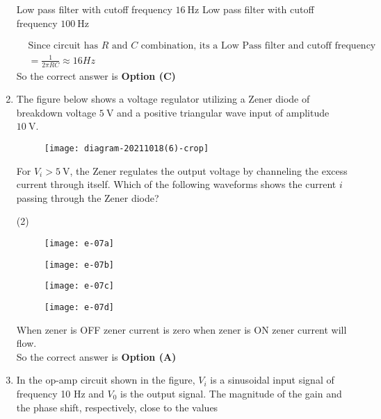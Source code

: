 \begin{enumerate}
\begin{tasks}
\task[\textbf{C.}] Low pass filter with cutoff frequency $16 \mathrm{~Hz}$
\task[\textbf{D.}] Low pass filter with cutoff frequency $100 \mathrm{~Hz}$
\end{tasks}
\begin{answer}
\begin{align*}
&\text{Since circuit has $R$ and $C$ combination, its a Low Pass filter and cutoff frequency}\\
&=\frac{1}{2 \pi R C} \approx 16 H z
\end{align*}
So the correct answer is \textbf{Option (C)}
\end{answer}
	\item The figure below shows a voltage regulator utilizing a Zener diode of breakdown voltage $5 \mathrm{~V}$ and a positive triangular wave input of amplitude $10 \mathrm{~V}$.\\
	\begin{figure}[H]
		\centering
		\texttt{[image: diagram-20211018(6)-crop]}
	\end{figure}
	For $V_{i}>5 \mathrm{~V}$, the Zener regulates the output voltage by channeling the excess current through itself. Which of the following waveforms shows the current $i$ passing through the Zener diode?
\begin{tasks}(2)
\task[\textbf{A.}] \begin{figure}[H]
	\centering
	\texttt{[image: e-07a]}
\end{figure}
\task[\textbf{B.}] \begin{figure}[H]
	\centering
	\texttt{[image: e-07b]}
\end{figure}
\task[\textbf{C.}] \begin{figure}[H]
	\centering
	\texttt{[image: e-07c]}
\end{figure}
\task[\textbf{D.}] \begin{figure}[H]
	\centering
	\texttt{[image: e-07d]}
\end{figure}
\end{tasks}
\begin{answer}$\left. \right. $\\
When zener is OFF zener current is zero when zener is $\mathrm{ON}$ zener current will flow.\\
So the correct answer is \textbf{Option (A)}
\end{answer}
	\item In the op-amp circuit shown in the figure, $V_{i}$ is a sinusoidal input signal of frequency 10 $\mathrm{Hz}$ and $V_{0}$ is the output signal. The magnitude of the gain and the phase shift, respectively, close to the values\\

\end{enumerate}
